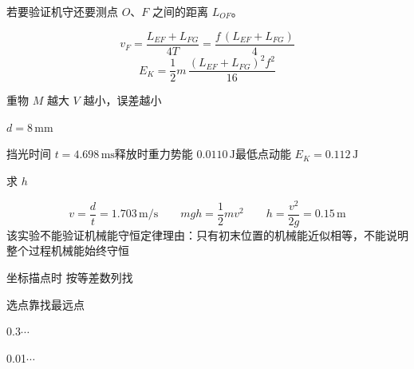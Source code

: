 
若要验证机守还要测点 $O$、$F$ 之间的距离 $L_{OF}$。

\[ v_F=\frac{L_{EF}+L_{FG}}{4T}=\frac{f\,(L_{EF}+L_{FG})}{4} \]
\[ E_K=\frac12 m\,\frac{(L_{EF}+L_{FG})^2f^2}{16} \]


重物 $M$ 越大 $V$ 越小，误差越小 %
\begin{problem}

$d=8\,\mathrm{mm}$

挡光时间 $t=4.698\,\mathrm{ms}$\quad 释放时重力势能 $0.0110\,\mathrm{J}$\quad 最低点动能 $E_K=0.112\,\mathrm{J}$ %

求 $h$
\begin{solution}
\[ v=\frac{d}{t}=1.703\,\mathrm{m/s}\qquad mgh=\frac12mv^2\qquad h=\frac{v^2}{2g}=0.15\,\mathrm{m} \]
该实验不能验证机械能守恒定律\quad 理由：只有初末位置的机械能近似相等，不能说明整个过程机械能始终守恒
\end{solution}
\end{problem}
坐标描点时 按等差数列找

选点靠找最远点

0.3\quad $\cdots$

0.01\quad $\cdots$

